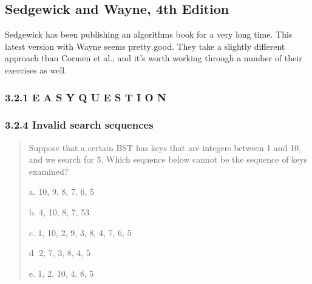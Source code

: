 \subsection{Sedgewick and Wayne, 4th Edition}

Sedgewick has been publishing an algorithms book for a very long time.
This latest version with Wayne seems pretty good. They take a slightly
different approach than Cormen et al., and it's worth working through
a number of their exercises as well.

\subsubsection{3.2.1 E A S Y Q U E S T I O N}



\subsubsection{3.2.4 Invalid search sequences}

\begin{quote}
Suppose that a certain BST has keys that are integers between 1 and 10, and we
search for 5. Which sequence below cannot be the sequence of keys examined?

a. 10, 9, 8, 7, 6, 5

b. 4, 10, 8, 7, 53

c. 1, 10, 2, 9, 3, 8, 4, 7, 6, 5

d. 2, 7, 3, 8, 4, 5

e. 1, 2, 10, 4, 8, 5
\end{quote}
